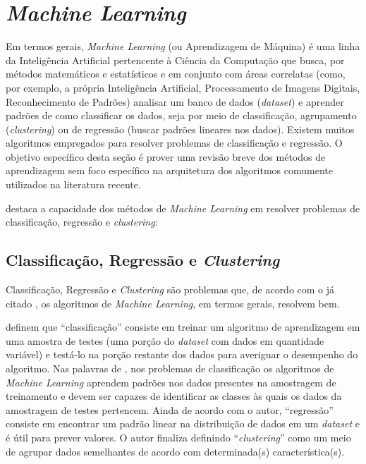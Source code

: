 \section{\textit{Machine Learning}}
\label{sec:machinelearning}


Em termos gerais, \textit{Machine Learning} (ou Aprendizagem de Máquina) é uma linha da Inteligência Artificial pertencente à Ciência da Computação que busca, por métodos matemáticos e estatísticos e em conjunto com áreas correlatas (como, por exemplo, a própria Inteligência Artificial, Processamento de Imagens Digitais, Reconhecimento de Padrões) analisar um banco de dados (\textit{dataset}) e aprender padrões de como classificar os dados, seja por meio de classificação, agrupamento (\textit{clustering}) ou de regressão (buscar padrões lineares nos dados). Existem muitos algoritmos empregados para resolver problemas de classificação e regressão. O objetivo específico desta seção é prover uma revisão breve dos métodos de aprendizagem sem foco específico na arquitetura dos algoritmos comumente utilizados na literatura recente.

 destaca a capacidade dos métodos de \textit{Machine Learning} em resolver problemas de classificação, regressão e \textit{clustering}:

\subsection{Classificação, Regressão e \textit{Clustering}}

Classificação, Regressão e \textit{Clustering} são problemas que, de acordo com o já citado 
, os algoritmos de \textit{Machine Learning}, em termos gerais, resolvem bem. 

 definem que ``classificação'' consiste em treinar um algoritmo de aprendizagem em uma amostra de testes (uma porção do \textit{dataset} com dados em quantidade variável) e testá-lo na porção restante dos dados para averiguar o desempenho do algoritmo. Nas palavras de , nos problemas de classificação os algoritmos de \textit{Machine Learning} aprendem padrões nos dados presentes na amostragem de treinamento e devem ser capazes de identificar as classes às quais os dados da amostragem de testes pertencem. Ainda de acordo com o autor, ``regressão'' consiste em encontrar um padrão linear na distribuição de dados em um \textit{dataset} e é útil para prever valores. O autor finaliza definindo ``\textit{clustering}'' como um meio de agrupar dados semelhantes de acordo com determinada(s) característica(s). 

